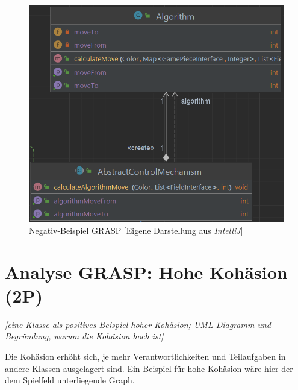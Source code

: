 \begin{figure}[htbp]
\centering
\centerline{\includegraphics[scale=.6]{grasp2}}
\caption{Negativ-Beispiel GRASP [Eigene Darstellung aus \emph{IntelliJ}]}
\label{fig:grasp2}
\end{figure}

\newpage
\section{Analyse GRASP: Hohe Kohäsion (2P)}
\emph{[eine Klasse als positives Beispiel hoher Kohäsion; UML Diagramm und Begründung, warum die Kohäsion hoch ist]}

\vspace{.4cm}

\noindent Die Kohäsion erhöht sich, je mehr Verantwortlichkeiten und Teilaufgaben in andere Klassen ausgelagert sind. Ein Beispiel für hohe Kohäsion wäre hier der dem Spielfeld unterliegende Graph.


